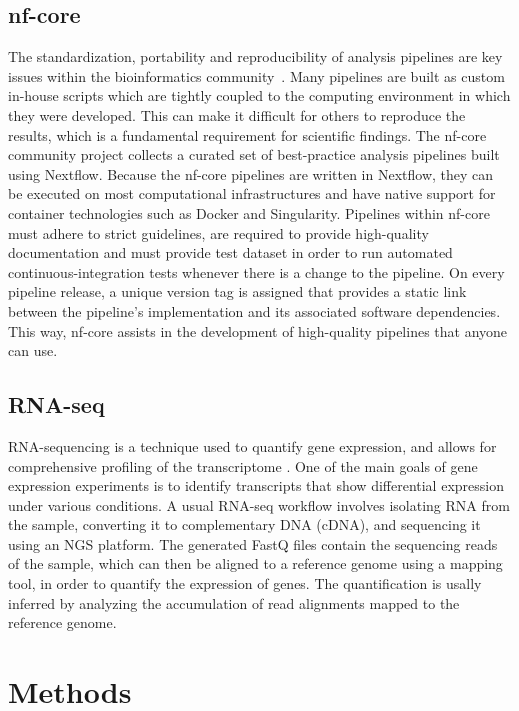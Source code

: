 \documentclass{article}
\theoremstyle{plain}
\theoremstyle{definition}
\theoremstyle{remark}
\begin{document}
\subsection{nf-core}
The standardization, portability and reproducibility of analysis pipelines are key issues within the bioinformatics community~\cite{ewels2020nf}. Many pipelines are built as custom in-house scripts which are tightly coupled to the computing environment in which they were developed. This can make it difficult for others to reproduce the results, which is a fundamental requirement for scientific findings. The nf-core community project collects a curated set of best-practice analysis pipelines built using Nextflow. Because the nf-core pipelines are written in Nextflow, they can be executed on most computational infrastructures and have native support for container technologies such as Docker and Singularity. Pipelines within nf-core must adhere to strict guidelines, are required to provide high-quality documentation and must provide test dataset in order to run automated continuous-integration tests whenever there is a change to the pipeline. On every pipeline release, a unique version tag is assigned that provides a static link between the pipeline’s implementation and its associated software dependencies. This way, nf-core assists in the development of high-quality pipelines that anyone can use.
\subsection{RNA-seq}
RNA-sequencing is a technique used to quantify gene expression, and allows for comprehensive profiling of the transcriptome \cite{Kukurba2015}. One of the main goals of gene expression experiments is to identify transcripts that show differential expression under various conditions. A usual RNA-seq workflow involves isolating RNA from the sample, converting it to complementary DNA (cDNA), and sequencing it using an NGS platform. The generated FastQ files contain the sequencing reads of the sample, which can then be aligned to a reference genome using a mapping tool, in order to quantify the expression of genes. The quantification is usally inferred by analyzing the accumulation of read alignments mapped to the reference genome.

\section{Methods}
\end{document}
